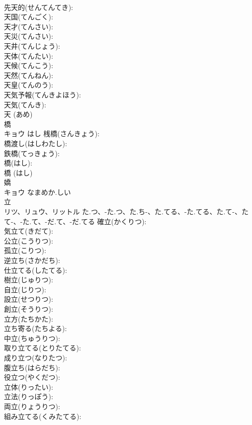 \documentclass[8pt]{extreport}
\begin{document}
\begin{CJK}{UTF8}{min}
\\	先天的(せんてんてき): 
\\	天国(てんごく): 
\\	天才(てんさい): 
\\	天災(てんさい): 
\\	天井(てんじょう): 
\\	天体(てんたい): 
\\	天候(てんこう): 
\\	天然(てんねん): 
\\	天皇(てんのう): 
\\	天気予報(てんきよほう): 
\\	天気(てんき): 
\\	天 (あめ)
\\	橋			
\\	キョウ	はし	桟橋(さんきょう): 
\\	橋渡し(はしわたし): 
\\	鉄橋(てっきょう): 
\\	橋(はし): 
\\	橋 (はし)
\\	嬌		
\\	キョウ	なまめか.しい		
\\	立			
\\	リツ、リュウ、リットル	た.つ、-た.つ、た.ち-、た.てる、-た.てる、た.て-、たて-、-た.て、-だ.て、-だ.てる	確立(かくりつ): 
\\	気立て(きだて): 
\\	公立(こうりつ): 
\\	孤立(こりつ): 
\\	逆立ち(さかだち): 
\\	仕立てる(したてる): 
\\	樹立(じゅりつ): 
\\	自立(じりつ): 
\\	設立(せつりつ): 
\\	創立(そうりつ): 
\\	立方(たちかた): 
\\	立ち寄る(たちよる): 
\\	中立(ちゅうりつ): 
\\	取り立てる(とりたてる): 
\\	成り立つ(なりたつ): 
\\	腹立ち(はらだち): 
\\	役立つ(やくだつ): 
\\	立体(りったい): 
\\	立法(りっぽう): 
\\	両立(りょうりつ): 
\\	組み立てる(くみたてる): 

\end{CJK}
\end{document}
